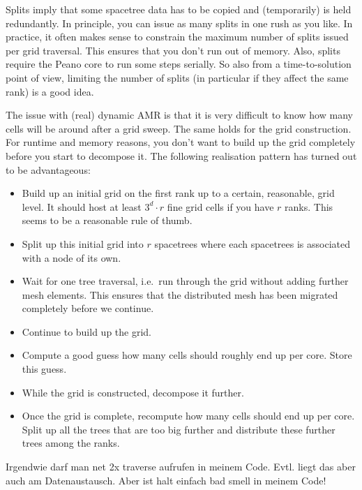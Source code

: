 \begin{remark}
 Splits imply that some spacetree data has to be copied and (temporarily) is
 held redundantly. In principle, you can issue as many splits in one rush as you
 like. In practice, it often makes sense to constrain the maximum number of
 splits issued per grid traversal. This ensures that you don't run out of
 memory. Also, splits require the Peano core to run some steps serially. 
 So also from a time-to-solution point of view, limiting the number of splits
 (in particular if they affect the same rank) is a good idea.
\end{remark}



The issue with (real) dynamic AMR is that it is very difficult to know how many
cells will be around after a grid sweep.
The same holds for the grid construction.
For runtime and memory reasons, you don't want to build up the grid completely
before you start to decompose it.
The following realisation pattern has turned out to be advantageous:
\begin{itemize}
  \item Build up an initial grid on the first rank up to a certain, reasonable,
  grid level. It should host at least $3^d \cdot r$ fine grid cells if you have
  $r$ ranks. This seems to be a reasonable rule of thumb.
  \item Split up this initial grid into $r$ spacetrees where each spacetrees is
  associated with a node of its own.
  \item Wait for one tree traversal, i.e.~run through the grid without adding
  further mesh elements. This ensures that the distributed mesh has been
  migrated completely before we continue.
  \item Continue to build up the grid.
  \item Compute a good guess how many cells should roughly end up per core.
  Store this guess.
  \item While the grid is constructed, decompose it further.
  \item Once the grid is complete, recompute how many cells should end up per
  core. Split up all the trees that are too big further and distribute these
  further trees among the ranks.
\end{itemize}



\begin{remark}
Irgendwie darf man net 2x traverse aufrufen in meinem Code. Evtl. liegt das aber
auch am Datenaustausch. Aber ist halt einfach bad smell in meinem Code!
\end{remark}

